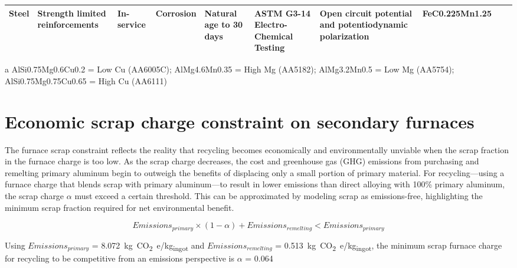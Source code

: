 \begin{table}[!htbp]
\begin{threeparttable}
{\begin{tabular}{@{}p{1.5cm} p{2.4cm} p{2cm} p{2.5cm} p{4cm} p{3.5cm} p{3.8cm} p{3.2cm} p{2.7cm} p{2.7cm}@{}}
{Steel}    & {Strength limited reinforcements}  & {In-service}    & {Corrosion}       & {Natural age to 30 days}                                              & {ASTM G3-14 Electro-Chemical Testing}     & {Open circuit potential and potentiodynamic polarization}  & {FeC0.225Mn1.25}              & {}             & {}                  \\
\bottomrule
\end{tabular}%
}
\begin{tablenotes}
\tiny %
\item[a] AlSi0.75Mg0.6Cu0.2 = Low Cu (AA6005C); AlMg4.6Mn0.35 = High Mg (AA5182); AlMg3.2Mn0.5 = Low Mg (AA5754); AlSi0.75Mg0.75Cu0.65 = High Cu (AA6111)
\end{tablenotes}
\end{threeparttable}
\end{table}

\FloatBarrier

\section{Economic scrap charge constraint on secondary furnaces}

The furnace scrap constraint reflects the reality that recycling becomes economically and environmentally unviable when the scrap fraction in the furnace charge is too low. As the scrap charge decreases, the cost and greenhouse gas (GHG) emissions from purchasing and remelting primary aluminum begin to outweigh the benefits of displacing only a small portion of primary material. For recycling—using a furnace charge that blends scrap with primary aluminum—to result in lower emissions than direct alloying with 100\% primary aluminum, the scrap charge $\alpha$ must exceed a certain threshold. This can be approximated by modeling scrap as emissions-free, highlighting the minimum scrap fraction required for net environmental benefit.


\begin{equation} \label{eqn: Min alpha (emissions)}
Emissions_{primary} \times (1-\alpha)+Emissions_{remelting} < Emissions_{primary}
\end{equation}

Using $Emissions_{primary}$ = \SI{8.072}{kg CO_{2}e/kg_{ingot}} and 
$Emissions_{remelting}$ = \SI{0.513}{kg CO_{2}e/kg_{ingot}}, the minimum scrap furnace charge for recycling to be competitive from an emissions perspective is $\alpha$ = 0.064

